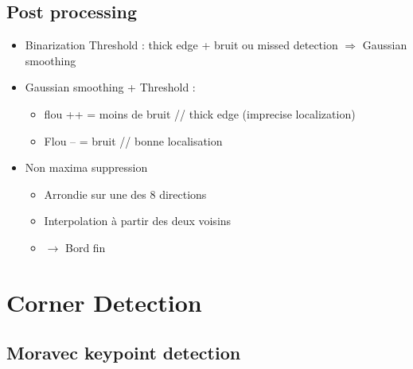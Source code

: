 \documentclass{article}
\theoremstyle{plain}%
\theoremstyle{definition}
\theoremstyle{remark}
\begin{document}
\subsection{Post processing}
\begin{itemize}
    \item Binarization Threshold : thick edge + bruit ou missed detection $\Rightarrow$ Gaussian smoothing 
    \item Gaussian smoothing + Threshold : \begin{itemize}
        \item flou ++ = moins de bruit // thick edge (imprecise localization)
        \item Flou -- = bruit // bonne localisation
    \end{itemize}
    \item Non maxima suppression \begin{itemize}
        \item Arrondie sur une des 8 directions 
        \item Interpolation à partir des deux voisins 
        \item $\rightarrow$ Bord fin 
    \end{itemize}
\end{itemize}


\section{Corner Detection}
\subsection{Moravec keypoint detection}
\end{document}
